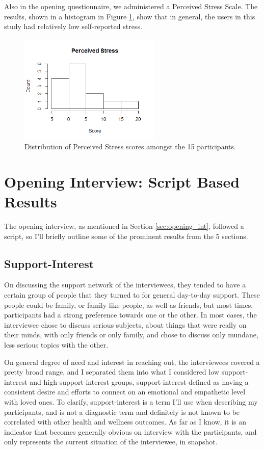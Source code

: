   Also in the opening questionnaire, we administered a Perceived Stress Scale.
  The results, shown in a histogram in Figure \ref{fig:perceived_stress},
  show that in general, the users in this study had relatively low
  self-reported stress.

    \begin{figure}
    \centering
    \includegraphics[width=0.6\textwidth]{perceived_stress.png}
    \caption{
      Distribution of Perceived Stress scores amongst the 15 participants.
    }
    \label{fig:perceived_stress}
    \end{figure}

\section{Opening Interview: Script Based Results}
  The opening interview, as mentioned in Section \ref{sec:opening_int},
  followed a script, so I'll briefly outline some of the
  prominent results from the 5 sections.

  \subsection{Support-Interest}
  On discussing the support network of the interviewees,
  they tended to have a certain group of people that they turned to for
  general day-to-day support.
  These people could be family, or family-like people, as well as friends,
  but most times, participants had a strong preference towards one or the other.
  In most cases, the interviewee chose to discuss serious subjects,
  about things that were really on their minds,
  with only friends or only family,
  and chose to discuss only mundane, less serious topics with the other.

  On general degree of need and interest in reaching out,
  the interviewees covered a pretty broad range,
  and I separated them into what I considered low support-interest
  and high support-interest groups,
  support-interest defined as having a consistent desire and efforts to
  connect on an emotional and empathetic level with loved ones.
  To clarify, support-interest is a term I'll use when describing my participants,
  and is not a diagnostic term and definitely is not known to be
  correlated with other health and wellness outcomes.
  As far as I know, it is an indicator that becomes generally obvious
  on interview with the participants,
  and only represents the current situation of the interviewee, in snapshot.

